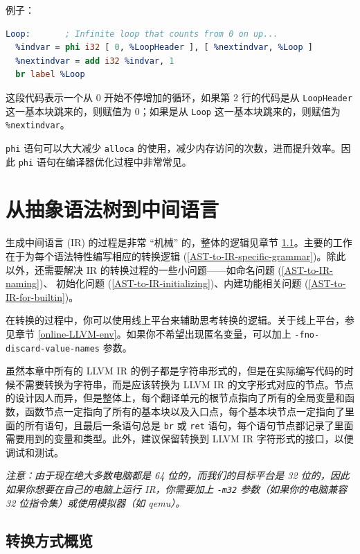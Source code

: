 例子：
\begin{lstlisting}[language=llvm]
Loop:       ; Infinite loop that counts from 0 on up...
  %indvar = phi i32 [ 0, %LoopHeader ], [ %nextindvar, %Loop ]
  %nextindvar = add i32 %indvar, 1
  br label %Loop
\end{lstlisting}

这段代码表示一个从 0 开始不停增加的循环，如果第 2 行的代码是从 \texttt{LoopHeader}
这一基本块跳来的，则赋值为 0；如果是从 \texttt{Loop} 这一基本块跳来的，则赋值为
\texttt{\%nextindvar}。

\texttt{phi} 语句可以大大减少 \texttt{alloca} 的使用，减少内存访问的次数，进而提升效率。因此
\texttt{phi} 语句在编译器优化过程中非常常见。

\section{从抽象语法树到中间语言}\label{AST-to-IR}

生成中间语言 (IR) 的过程是非常 “机械” 的，整体的逻辑见章节
\ref{AST-to-IR-details}。主要的工作在于为每个语法特性编写相应的转换逻辑
(\ref{AST-to-IR-specific-grammar})。除此以外，还需要解决
IR 的转换过程的一些小问题——如命名问题 (\ref{AST-to-IR-naming})、
初始化问题 (\ref{AST-to-IR-initializing})、内建功能相关问题
(\ref{AST-to-IR-for-builtin})。

在转换的过程中，你可以使用线上平台来辅助思考转换的逻辑。关于线上平台，参见章节
\ref{online-LLVM-env}。如果你不希望出现匿名变量，可以加上
\texttt{-fno-discard-value-names} 参数。

虽然本章中所有的 LLVM IR 的例子都是字符串形式的，但是在实际编写代码的时候不需要转换为字符串，而是应该转换为
LLVM IR 的文字形式对应的节点。节点的设计因人而异，但是整体上，每个翻译单元的根节点指向了所有的全局变量和函数，函数节点一定指向了所有的基本块以及入口点，每个基本块节点一定指向了里面的所有语句，且最后一条语句总是
\texttt{br} 或 \texttt{ret} 语句，每个语句节点都记录了里面需要用到的变量和类型。此外，建议保留转换到
LLVM IR 字符形式的接口，以便调试和测试。

\textit{注意：由于现在绝大多数电脑都是 64 位的，而我们的目标平台是 32
位的，因此如果你想要在自己的电脑上运行 IR，你需要加上 \texttt{-m32} 参数（如果你的电脑兼容
32 位指令集）或使用模拟器（如 qemu）。}

\subsection{转换方式概览}\label{AST-to-IR-details}

